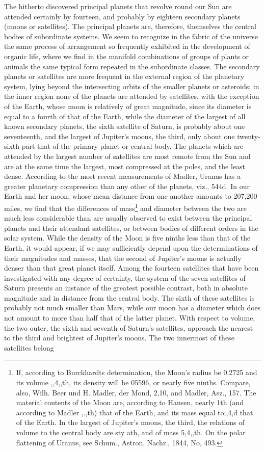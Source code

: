 The hitherto discovered principal planets that revolve round our Sun are attended certainly by fourteen, and probably by eighteen secondary planets (moons or satellites). The principal planets are, therefore, themselves the central bodies of subordinate systems. We seem to recognize in the fabric of the universe the same process of arrangement so frequently exhibited in the development of organic life, where we find in the manifold combinations of groups of plants or animals the same typical form repeated in the subordinate classes. The secondary planets or satellites are more frequent in the external region of the planetary system, lying beyond the intersecting orbits of the smaller planets or asteroids; in the inner region none of the planets are attended by satellites, with the exception of the Earth, whose moon is relatively of great magnitude, since its diameter is equal to a fourth of that of the Earth, while the diameter of the largest of all known secondary planets, the sixth satellite of Saturn, is probably about one seventeenth, and the largest of Jupiter's moons, the third, only about one twenty-sixth part that of the primary planet or central body. The planets which are attended by the largest number of satellites are most remote from the Sun and are at the same time the largest, most compressed at the poles, and the least dense. According to the most recent measurements of Madler, Uranus has a greater planetary compression than any other of the planets, viz., 544d. In our Earth and her moon, whose mean distance from one another amounts to 207,200 miles, we find that the differences of mass\footnote{If, according to Burckhardts determination, the Moon's radius be 0.2725 and its volume ,,4,,th, its density will be 05596, or nearly five ninths. Compare, also, Wilh. Beer und H. Madler, der Mond, 2,10, and Madler, Asz., 157. The material contents of the Moon are, according to Hausen, nearly 1th (and according to Madler ,.,th) that of the Earth, and its mass equal to;,4,d that of the Earth. In the largest of Jupiter's moons, the third, the relations of volume to the central body are sty ath, and of mass 5,4,,th. On the polar flattening of Uranus, see Schum., Astron. Nachr., 1844, No, 493.} and diameter between the two are much less considerable than are usually observed to exist between the principal planets and their attendant satellites, or between bodies of different orders in the solar system. While the density of the Moon is five ninths less than that of the Earth, it would appear, if we may sufficiently depend upon the determinations of their magnitudes and masses, that the second of Jupiter's moons is actually denser than that great planet itself. Among the fourteen satellites that have been investigated with any degree of certainty, the system of the seven satellites of Saturn presents an instance of the greatest possible contrast, both in absolute magnitude and in distance from the central body. The sixth of these satellites is probably not much smaller than Mars, while our moon has a diameter which does not amount to more than half that of the latter planet. With respect to volume, the two outer, the sixth and seventh of Saturn's satellites, approach the nearest to the third and brightest of Jupiter's moons. The two innermost of these satellites belong 
